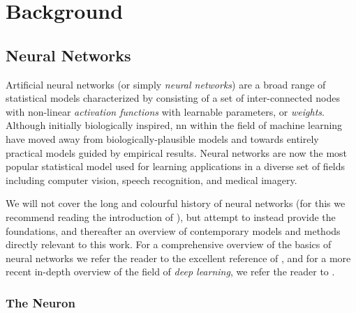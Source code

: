 \documentclass[thesis]{subfiles}
\begin{document}
\chapter{Background}
\label{background}
\section{Neural Networks}
Artificial neural networks (or simply \emph{neural networks}) are a broad range of statistical models characterized by consisting of a set of inter-connected nodes with non-linear \emph{activation functions} with learnable parameters, or \emph{weights}.
 Although initially biologically inspired, \gls{nn} within the field of machine learning have moved away from biologically-plausible models and towards entirely practical models guided by empirical results. Neural networks are now the most popular statistical model used for learning applications in a diverse set of fields including computer vision, speech recognition, and medical imagery. 

We will not cover the long and colourful history of neural networks (for this we recommend reading the introduction of \citet{goodfellow2016deep}), but attempt to instead provide the foundations, and thereafter an overview of contemporary models and methods directly relevant to this work. For a comprehensive overview of the basics of neural networks we refer the reader to the excellent reference of \citet{Bishop1995}, and for a more recent  in-depth overview of the field of \emph{deep learning}, we refer the reader to \citet{goodfellow2016deep}. 

\subsection{The Neuron}
\end{document}
